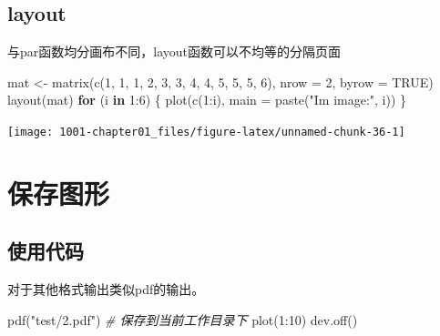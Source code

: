 \documentclass[
]{book}
\newenvironment{Shaded}{\begin{snugshade}}{\end{snugshade}}
\newcommand{\AttributeTok}[1]{\textcolor[rgb]{0.77,0.63,0.00}{#1}}
\newcommand{\CommentTok}[1]{\textcolor[rgb]{0.56,0.35,0.01}{\textit{#1}}}
\newcommand{\ConstantTok}[1]{\textcolor[rgb]{0.00,0.00,0.00}{#1}}
\newcommand{\ControlFlowTok}[1]{\textcolor[rgb]{0.13,0.29,0.53}{\textbf{#1}}}
\newcommand{\DecValTok}[1]{\textcolor[rgb]{0.00,0.00,0.81}{#1}}
\newcommand{\FunctionTok}[1]{\textcolor[rgb]{0.00,0.00,0.00}{#1}}
\newcommand{\NormalTok}[1]{#1}
\newcommand{\OtherTok}[1]{\textcolor[rgb]{0.56,0.35,0.01}{#1}}
\newcommand{\SpecialCharTok}[1]{\textcolor[rgb]{0.00,0.00,0.00}{#1}}
\newcommand{\StringTok}[1]{\textcolor[rgb]{0.31,0.60,0.02}{#1}}
\begin{document}
\hypertarget{layout}{%
\subsection{layout}\label{layout}}

与par函数均分画布不同，layout函数可以不均等的分隔页面

\begin{Shaded}
\begin{Highlighting}[]
\NormalTok{mat }\OtherTok{\textless{}{-}} \FunctionTok{matrix}\NormalTok{(}\FunctionTok{c}\NormalTok{(}\DecValTok{1}\NormalTok{, }\DecValTok{1}\NormalTok{, }\DecValTok{1}\NormalTok{, }\DecValTok{2}\NormalTok{, }\DecValTok{3}\NormalTok{, }\DecValTok{3}\NormalTok{, }\DecValTok{4}\NormalTok{, }\DecValTok{4}\NormalTok{, }\DecValTok{5}\NormalTok{, }\DecValTok{5}\NormalTok{, }\DecValTok{5}\NormalTok{, }\DecValTok{6}\NormalTok{), }\AttributeTok{nrow =} \DecValTok{2}\NormalTok{, }\AttributeTok{byrow =} \ConstantTok{TRUE}\NormalTok{)}
\FunctionTok{layout}\NormalTok{(mat)}
\ControlFlowTok{for}\NormalTok{ (i }\ControlFlowTok{in} \DecValTok{1}\SpecialCharTok{:}\DecValTok{6}\NormalTok{) \{}
    \FunctionTok{plot}\NormalTok{(}\FunctionTok{c}\NormalTok{(}\DecValTok{1}\SpecialCharTok{:}\NormalTok{i), }\AttributeTok{main =} \FunctionTok{paste}\NormalTok{(}\StringTok{"I\textquotesingle{}m image:"}\NormalTok{, i))}
\NormalTok{\}}
\end{Highlighting}
\end{Shaded}

\begin{center}\texttt{[image: 1001-chapter01\_files/figure-latex/unnamed-chunk-36-1]} \end{center}

\hypertarget{ux4fddux5b58ux56feux5f62}{%
\section{保存图形}\label{ux4fddux5b58ux56feux5f62}}

\hypertarget{ux4f7fux7528ux4ee3ux7801}{%
\subsection{使用代码}\label{ux4f7fux7528ux4ee3ux7801}}

对于其他格式输出类似pdf的输出。

\begin{Shaded}
\begin{Highlighting}[]
\FunctionTok{pdf}\NormalTok{(}\StringTok{"test/2.pdf"}\NormalTok{)  }\CommentTok{\# 保存到当前工作目录下}
\FunctionTok{plot}\NormalTok{(}\DecValTok{1}\SpecialCharTok{:}\DecValTok{10}\NormalTok{)}
\FunctionTok{dev.off}\NormalTok{()}
\end{Highlighting}
\end{Shaded}
\end{document}
